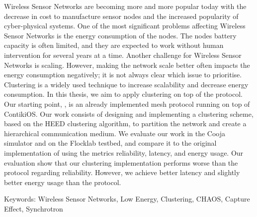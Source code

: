 Wireless Sensor Networks are becoming more and more popular today with the decrease in cost to manufacture sensor nodes and the increased popularity of cyber-physical systems. One of the most significant problems affecting Wireless Sensor Networks is the energy consumption of the nodes. The nodes battery capacity is often limited, and they are expected to work without human intervention for several years at a time. Another challenge for Wireless Sensor Networks is scaling. However, making the network scale better often impacts the energy consumption negatively; it is not always clear which issue to prioritise. Clustering is a widely used technique to increase scalability and decrease energy consumption. In this thesis, we aim to apply clustering on top of the \atwo{} protocol. Our starting point, \atwo{}, is an already implemented mesh protocol running on top of ContikiOS. Our work consists of designing and implementing a clustering scheme, based on the HEED clustering algorithm, to partition the network and create a hierarchical communication medium. We evaluate our work in the Cooja simulator and on the Flocklab testbed, and compare it to the original implementation of \atwo{} using the metrics reliability, latency, and energy usage. Our evaluation show that our clustering implementation performs worse than the \atwo{} protocol regarding reliability. However, we achieve better latency and slightly better energy usage than the \atwo{} protocol.


\iffalse
Later:
Results and outcome from the thesis.
E.g.
We've pushed the theoretical bound of the number of participating nodes by order of a magnitude larger. Network lifetime has seen an increase by 10%
\fi

\vfill
Keywords: Wireless Sensor Networks, Low Energy, Clustering, CHAOS, Capture Effect, Synchrotron

\newpage				%
\thispagestyle{empty}
\mbox{}